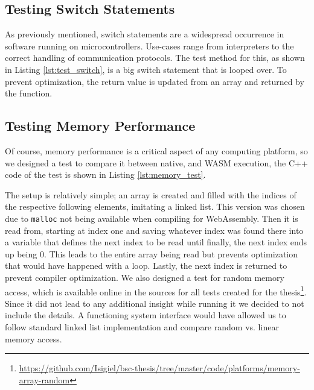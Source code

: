 

\subsection{Testing Switch Statements}\label{subsec:m_test_switch}

As previously mentioned, switch statements are a widespread occurrence in software running on microcontrollers. Use-cases range from interpreters to the correct handling of communication protocols. The test method for this, as shown in Listing \ref{lst:test_switch}, is a big switch statement that is looped over. To prevent optimization, the return value is updated from an array and returned by the function.



\subsection{Testing Memory Performance}\label{subsec:m_test_memory}

Of course, memory performance is a critical aspect of any computing platform, so we designed a test to compare it between native, and WASM execution, the C++ code of the test is shown in Listing \ref{lst:memory_test}.



The setup is relatively simple; an array is created and filled with the indices of the respective following elements, imitating a linked list. This version was chosen due to \lstinline{malloc} not being available when compiling for WebAssembly. Then it is read from, starting at index one and saving whatever index was found there into a variable that defines the next index to be read until finally, the next index ends up being 0. This leads to the entire array being read but prevents optimization that would have happened with a loop. Lastly, the next index is returned to prevent compiler optimization.
We also designed a test for random memory access, which is available online in the sources for all tests created for the thesis\footnote{\url{https://github.com/Isigiel/bsc-thesis/tree/master/code/platforms/memory-array-random}}. Since it did not lead to any additional insight while running it we decided to not include the details. A functioning system interface would have allowed us to follow standard linked list implementation and compare random vs. linear memory access.

